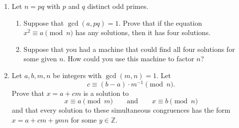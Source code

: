 \documentclass[11pt,letterpaper]{article}
\newcommand{\Z}{\mathbb{Z}}
\begin{document}
\begin{enumerate}
    \item Let $n=pq$ with $p$ and $q$ distinct odd primes.
    \begin{enumerate}
        \item Suppose that $\gcd(a, pq) = 1$.
        Prove that if the equation $x^2 \equiv a\pmod n$ has any solutions, then it has four solutions.

        \item Suppose that you had a machine that could find all four solutions for some given $n$.
        How could you use this machine to factor $n$?
    \end{enumerate}

    \item Let $a,b,m,n$ be integers with $\gcd(m,n) = 1$.
    Let
    \[
        c \equiv(b-a)\cdot m^{-1}\pmod n.
    \]
    Prove that $x = a+cm$ is a solution to
    \[
        x\equiv a\pmod m\qquad \text{and}\qquad x\equiv b\pmod n
    \]
    and that every solution to these simultaneous congruences has the form $x=a+cm+ymn$ for some $y\in \Z$.
\end{enumerate}
\end{document}
